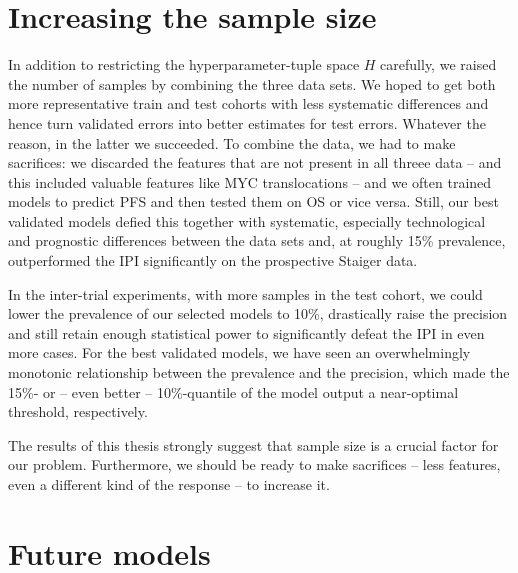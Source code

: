 \section{Increasing the sample size}

In addition to restricting the hyperparameter-tuple space $H$ carefully, we raised the number of 
samples by combining the three data sets. We hoped to get both more representative train and test 
cohorts with less systematic differences and hence turn validated errors into better estimates 
for test errors. Whatever the reason, in the latter we succeeded. To combine the data, we had to 
make sacrifices: we discarded the features that are 
not present in all threee data -- and this included valuable features like MYC translocations -- 
and we often trained models to predict PFS and then tested them on OS or vice versa. Still, our 
best validated models defied this together with systematic, especially technological and prognostic 
differences between the data sets and, at roughly \num{15}\% prevalence, outperformed the IPI 
significantly on the prospective Staiger data.

In the inter-trial experiments, with more samples in the test cohort, we could lower the prevalence 
of our selected models to \num{10}\%, drastically raise the precision and still retain enough 
statistical power to significantly defeat the IPI in even more cases. For the best validated models, 
we have seen an overwhelmingly monotonic relationship between the prevalence and the precision, 
which made the \num{15}\%- or -- even better -- \num{10}\%-quantile of the model output a 
near-optimal threshold, respectively. 

The results of this thesis strongly suggest that sample size is a crucial factor 
for our problem. Furthermore, we should be ready to make sacrifices -- less features, 
even a different kind of the response -- to increase it. 

\section{Future models}